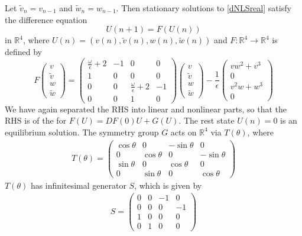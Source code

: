 \documentclass[12pt]{article}
\def\R{{\mathbb R}}
\begin{document}
Let $\tilde{v}_n = v_{n-1}$ and $\tilde{w}_n = w_{n-1}$. Then stationary solutions to \eqref{dNLSreal} satisfy the difference equation 
\begin{equation}\label{dnlsdiffR4}
U(n+1) = F(U(n))
\end{equation}
in $\R^4$, where $U(n) = (v(n), \tilde{v}(n), w(n), \tilde{w}(n))$ and $F:\R^4 \rightarrow \R^4$ is defined by
\begin{equation}\label{FdNLS}
F\begin{pmatrix}
v \\ \tilde{v} \\ w \\ \tilde{w}
\end{pmatrix} =
\begin{pmatrix}
\frac{\omega}{\epsilon} + 2 & -1 & 0 & 0 \\
1 & 0 & 0 & 0 \\
0 & 0 & \frac{\omega}{\epsilon} + 2 & -1 \\
0 & 0 & 1 & 0
\end{pmatrix}
\begin{pmatrix}
v \\ \tilde{v} \\ w \\ \tilde{w}
\end{pmatrix}
- \frac{1}{\epsilon} 
\begin{pmatrix}
v w^2 + v^3 \\ 0 \\ v^2 w + w^3 \\ 0
\end{pmatrix}
\end{equation}
We have again separated the RHS into linear and nonlinear parts, so that the RHS is of the for $F(U) = DF(0) U + G(U)$. The rest state $U(n) = 0$ is an equilibrium solution. The symmetry group $G$ acts on $\R^4$ via $T(\theta)$, where
\begin{align}\label{TdNLS}
T(\theta) =
\begin{pmatrix}
\cos\theta & 0 &-\sin\theta & 0 \\
0 & \cos\theta & 0 &-\sin\theta \\
\sin\theta & 0 & \cos\theta & 0 \\
0 & \sin\theta & 0 & \cos\theta 
\end{pmatrix}
\end{align}
$T(\theta)$ has infinitesimal generator $S$, which is given by
\begin{align}\label{dnlsSgen}
S =
\begin{pmatrix}
0 & 0 &-1 & 0 \\
0 & 0 & 0 &-1 \\
1 & 0 & 0 & 0 \\
0 & 1 & 0 & 0 
\end{pmatrix}
\end{align}
\end{document}
